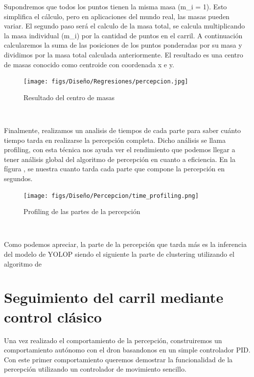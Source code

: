   Supondremos que todos los puntos tienen la misma masa (m\_i = 1). Esto simplifica el cálculo, pero en aplicaciones del mundo real, las masas pueden variar.
  El segundo paso será el calculo de la masa total, se calcula multiplicando la masa individual (m\_i) por la cantidad de puntos en el carril. A continuación calcularemos
  la suma de las posiciones de los puntos ponderadas por su masa y dividimos por la masa total calculada anteriormente. El resultado es una centro de masas conocido como centroide
  con coordenada x e y. 

  \begin{figure} [H]
    \begin{center}
      \texttt{[image: figs/Diseño/Regresiones/percepcion.jpg]}
    \end{center}
    \caption{Resultado del centro de masas}
    \label{fig:centro de masas}
  \end{figure}\

  Finalmente, realizamos un analisis de tiempos de cada parte para saber cuánto tiempo tarda en realizarse la percepción completa. Dicho análisis se llama profiling, con esta técnica 
  nos ayuda ver el rendimiento que podemos llegar a tener análisis global del algoritmo de percepción en cuanto a eficiencia. En la fígura , se nuestra cuanto tarda cada parte que compone 
  la percepción en segundos.

  \begin{figure} [H]
    \begin{center}
      \texttt{[image: figs/Diseño/Percepcion/time\_profiling.png]}
    \end{center}
    \caption{Profiling de las partes de la percepción}
    \label{fig:centro de masas}
  \end{figure}\

  Como podemos apreciar, la parte de la percepción que tarda más es la inferencia del modelo de YOLOP siendo el siguiente la parte de clustering utilizando el algoritmo de 

  \section{Seguimiento del carril mediante control clásico}
  \label{sec:Control}

  Una vez realizado el comportamiento de la percepción, construiremos un comportamiento autónomo con el dron basandonos en un simple controlador PID. 
 Con este primer comportamiento queremos demostrar la funcionalidad de la percepción utilizando un controlador de movimiento sencillo. \newline

